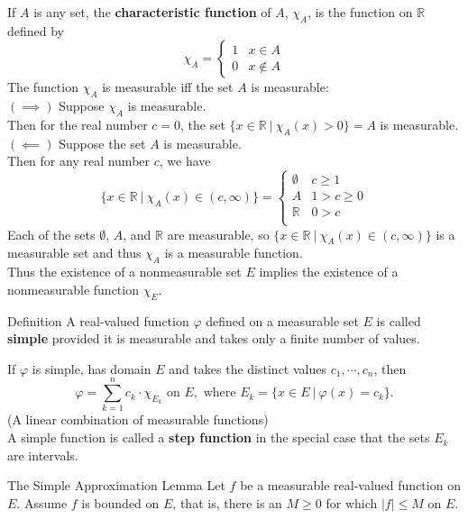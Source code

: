 \begin{flushleft}
    If $A$ is any set, the \textbf{characteristic function} of $A$, $\chi_A$, is the function on $\mathbb{R}$ defined by 
    \[
        \chi_A=
        \begin{cases}
            1&x\in A\\
            0&x\notin A
        \end{cases}  
    \]
    The function $\chi_A$ is measurable iff the set $A$ is measurable:\\
    $(\implies)$ Suppose $\chi_A$ is measurable.\\
    Then for the real number $c=0$, the set $\{x\in\mathbb{R}\ |\ \chi_A(x)>0\}=A$ is measurable.\\
    $(\impliedby)$ Suppose the set $A$ is measurable.\\
    Then for any real number $c$, we have
    \[
        \{x\in\mathbb{R}\ |\ \chi_A(x)\in(c,\infty)\}=
        \begin{cases}
            \emptyset&c\ge1\\
            A& 1>c\ge0\\
            \mathbb{R}&0>c\\
        \end{cases}
    \]
    Each of the sets $\emptyset$, $A$, and $\mathbb{R}$ are measurable, so $\{x\in\mathbb{R}\ |\ \chi_A(x)\in(c,\infty)\}$ is a measurable set and thus $\chi_A$ is a measurable function.\\
    Thus the existence of a nonmeasurable set $E$ implies the existence of a nonmeasurable function $\chi_E$.
        \begin{namedthm*}{Definition}
            A real-valued function $\varphi$ defined on a measurable set $E$ is called \textbf{simple} provided it is measurable and takes only a finite number of values.          
        \end{namedthm*}
        If $\varphi$ is simple, has domain $E$ and takes the distinct values $c_1,\cdots,c_n$, then
        \[
            \varphi=\sum_{k=1}^n c_k\cdot\chi_{E_k}\text{ on }E,\text{ where }E_k=\{x\in E\ |\ \varphi(x)=c_k\}.   
        \]
        (A linear combination of measurable functions)\\
        A simple function is called a \textbf{step function} in the special case that the sets $E_k$ are intervals. 
    \begin{namedthm*}{The Simple Approximation Lemma}
        Let $f$ be a measurable real-valued function on $E$. 
        Assume $f$ is bounded on $E$, that is, there is an $M\ge0$ for which $|f|\le M$ on $E$.

\end{namedthm*}
\end{flushleft}
